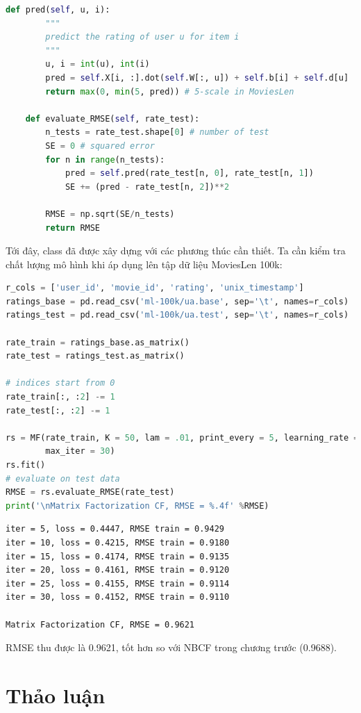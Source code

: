 \begin{lstlisting}[language=Python]
    def pred(self, u, i):
        """ 
        predict the rating of user u for item i 
        """
        u, i = int(u), int(i)
        pred = self.X[i, :].dot(self.W[:, u]) + self.b[i] + self.d[u]
        return max(0, min(5, pred)) # 5-scale in MoviesLen 
    
    def evaluate_RMSE(self, rate_test):
        n_tests = rate_test.shape[0] # number of test 
        SE = 0 # squared error
        for n in range(n_tests):
            pred = self.pred(rate_test[n, 0], rate_test[n, 1])
            SE += (pred - rate_test[n, 2])**2 

        RMSE = np.sqrt(SE/n_tests)
        return RMSE
\end{lstlisting}

Tới đây, class  đã được xây dựng với các phương thúc 
cần thiết. Ta cần kiểm tra chất lượng mô hình khi áp dụng
lên tập dữ liệu MoviesLen 100k:
\begin{lstlisting}[language=Python]
r_cols = ['user_id', 'movie_id', 'rating', 'unix_timestamp']
ratings_base = pd.read_csv('ml-100k/ua.base', sep='\t', names=r_cols)
ratings_test = pd.read_csv('ml-100k/ua.test', sep='\t', names=r_cols)

rate_train = ratings_base.as_matrix()
rate_test = ratings_test.as_matrix()

# indices start from 0
rate_train[:, :2] -= 1
rate_test[:, :2] -= 1

rs = MF(rate_train, K = 50, lam = .01, print_every = 5, learning_rate = 50, 
        max_iter = 30)
rs.fit()
# evaluate on test data
RMSE = rs.evaluate_RMSE(rate_test)
print('\nMatrix Factorization CF, RMSE = %.4f' %RMSE)
\end{lstlisting}
\kq 
\begin{lstlisting}
iter = 5, loss = 0.4447, RMSE train = 0.9429
iter = 10, loss = 0.4215, RMSE train = 0.9180
iter = 15, loss = 0.4174, RMSE train = 0.9135
iter = 20, loss = 0.4161, RMSE train = 0.9120
iter = 25, loss = 0.4155, RMSE train = 0.9114
iter = 30, loss = 0.4152, RMSE train = 0.9110

Matrix Factorization CF, RMSE = 0.9621
\end{lstlisting}

RMSE thu được là 0.9621, tốt hơn so với NBCF trong chương trước (0.9688). 

\section{Thảo luận}
\label{sec:25_4}
 
